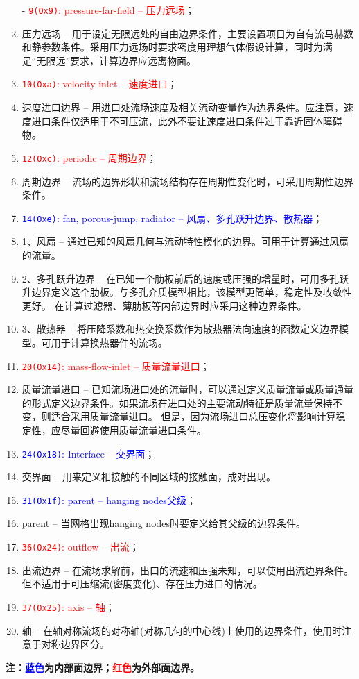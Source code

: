 \documentclass[lang=cn,11pt,a4paper]{elegantpaper} %
\begin{document}
\begin{enumerate}
  \item[-] \textcolor{red}{\lstinline{9(Ox9)}: pressure-far-field -- 压力远场}；
  \item[] 压力远场 -- 用于设定无限远处的自由边界条件，主要设置项目为自有流马赫数和静参数条件。采用压力远场时要求密度用理想气体假设计算，同时为满足“无限远”要求，计算边界应远离物面。
  \item[-] \textcolor{red}{\lstinline{10(Oxa)}: velocity-inlet -- 速度进口}；
  \item[] 速度进口边界 -- 用进口处流场速度及相关流动变量作为边界条件。应注意，速度进口条件仅适用于不可压流，此外不要让速度进口条件过于靠近固体障碍物。
  \item[-] \textcolor{red}{\lstinline{12(Oxc)}: periodic -- 周期边界}；
  \item[] 周期边界 -- 流场的边界形状和流场结构存在周期性变化时，可采用周期性边界条件。
  \item[-] \textcolor{blue}{\lstinline{14(Oxe)}: fan, porous-jump, radiator -- 风扇、多孔跃升边界、散热器}；
  \item[] 1、风扇 -- 通过已知的风扇几何与流动特性模化的边界。可用于计算通过风扇的流量。
  \item[] 2、多孔跃升边界 -- 在已知一个肋板前后的速度或压强的增量时，可用多孔跃升边界定义这个肋板。与多孔介质模型相比，该模型更简单，稳定性及收敛性更好。
  在计算过滤器、薄肋板等内部边界时应采用这种边界条件。
  \item[] 3、散热器 -- 将压降系数和热交换系数作为散热器法向速度的函数定义边界模型。可用于计算换热器件的流场。
  \item[-] \textcolor{red}{\lstinline{20(Ox14)}: mass-flow-inlet -- 质量流量进口}；
  \item[] 质量流量进口 -- 已知流场进口处的流量时，可以通过定义质量流量或质量通量的形式定义边界条件。如果流场在进口处的主要流动特征是质量流量保持不变，则适合采用质量流量进口。
  但是，因为流场进口总压变化将影响计算稳定性，应尽量回避使用质量流量进口条件。
  \item[-] \textcolor{blue}{\lstinline{24(Ox18)}: Interface -- 交界面}；
  \item[] 交界面 -- 用来定义相接触的不同区域的接触面，成对出现。
  \item[-] \textcolor{blue}{\lstinline{31(Ox1f)}: parent -- hanging nodes父级}；
  \item[] parent -- 当网格出现hanging nodes时要定义给其父级的边界条件。
  \item[-] \textcolor{red}{\lstinline{36(Ox24)}: outflow -- 出流}；
  \item[] 出流边界 -- 在流场求解前，出口的流速和压强未知，可以使用出流边界条件。但不适用于可压缩流(密度变化)、存在压力进口的情况。
  \item[-] \textcolor{red}{\lstinline{37(Ox25)}: axis -- 轴}；
  \item[] 轴 -- 在轴对称流场的对称轴(对称几何的中心线)上使用的边界条件，使用时注意于对称边界区分。
\end{enumerate}
\textbf{注：\textcolor{blue}{蓝色}为内部面边界；\textcolor{red}{红色}为外部面边界。}
\end{document}
